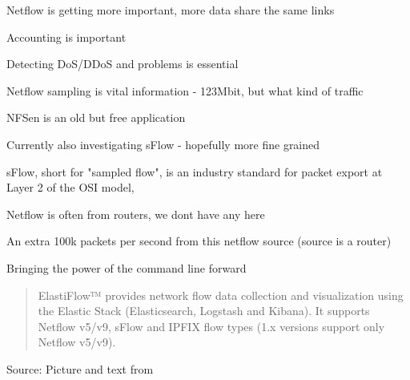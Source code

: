 \documentclass[Screen16to9,17pt]{foils}
\begin{document}

\begin{list2}
\item Netflow is getting more important, more data share the same links
\item Accounting is important
\item Detecting DoS/DDoS and problems is essential
\item Netflow sampling is vital information - 123Mbit, but what kind of traffic
\item NFSen is an old but free application
\item Currently also investigating sFlow - hopefully more fine grained
\item sFlow, short for "sampled flow", is an industry standard for packet export at Layer 2 of the OSI model, \\
\end{list2}

\centerline{Netflow is often from routers, we dont have any here}








\centerline{An extra 100k packets per second from this netflow source (source is a router)}



\centerline{Bringing the power of the command line forward}



\begin{quote}
  ElastiFlow™ provides network flow data collection and visualization using the Elastic Stack (Elasticsearch, Logstash and Kibana). It supports Netflow v5/v9, sFlow and IPFIX flow types (1.x versions support only Netflow v5/v9).
\end{quote}
Source: Picture and text from  \\

\end{document}
